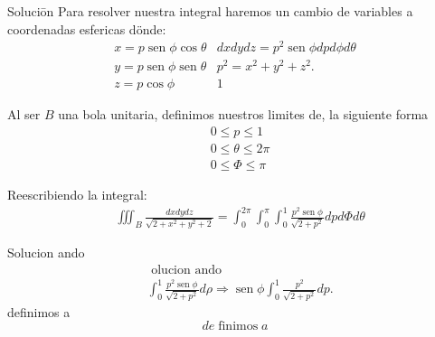 Soluciōn
Para resolver nuestra integral haremos un cambio de variables a coordenadas esfericas dönde:
$$
\begin{array}{ll}
x=p \operatorname{sen} \phi \cos \theta & d x d y d z=p^2 \operatorname{sen} \phi d p d \phi d \theta \\
y=p \operatorname{sen} \phi \operatorname{sen} \theta & p^2=x^2+y^2+z^2 . \\
z=p \cos \phi & 1
\end{array}
$$

Al ser $B$ una bola unitaria, definimos nuestros limites de, la siguiente forma
$$
\begin{aligned}
& 0 \leq p \leq 1 \\
& 0 \leq \theta \leq 2 \pi \\
& 0 \leq \Phi \leq \pi
\end{aligned}
$$

Reescribiendo la integral:
$$
\begin{aligned}
& \iiint_B \frac{d x d y d z}{\sqrt{2+x^2+y^2+2}}=\int_0^{2 \pi} \int_0^\pi \int_0^1 \frac{p^2 \operatorname{sen} \phi}{\sqrt{2+p^2}} d p d \Phi d \theta
\end{aligned}
$$

Solucion ando
$$
\begin{aligned}
& \text { olucion ando } \\
& \int_0^1 \frac{p^2 \operatorname{sen} \phi}{\sqrt{2+p^2}} d \rho \Rightarrow \operatorname{sen} \phi \int_0^1 \frac{p^2}{\sqrt{2+p^2}} d p .
\end{aligned}
$$
definimos a
$$
d e \operatorname{finimos} a
$$